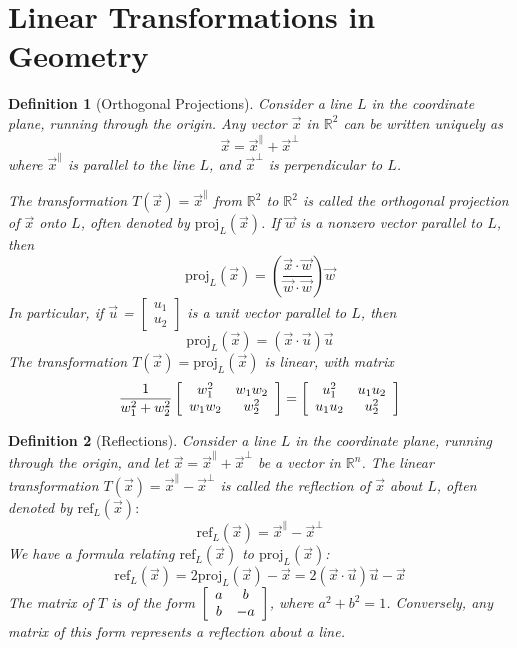 \documentclass[10pt]{report}
\newtheorem{def2}{Definition}[section]
\begin{document}
\section{Linear Transformations in Geometry}
\begin{def2}[Orthogonal Projections]
Consider a line $L$ in the coordinate plane, running through the origin. Any vector $\vec{x}$ in $\mathbb{R}^2$ can be written uniquely as
$$\vec{x} = \vec{x}^{\parallel} + \vec{x}^{\perp}$$
where $\vec{x}^{\parallel}$ is parallel to the line $L$, and $\vec{x}^{\perp}$ is perpendicular to $L$.

The transformation $T(\vec{x})= \vec{x}^{\parallel}$ from $\mathbb{R}^2$ to $\mathbb{R}^2$ is called the orthogonal projection of $\vec{x}$ onto $L$, often denoted by $\text{proj}_L( \vec{x})$. If $\vec{w}$ is a nonzero vector parallel to $L$, then
$$\text{proj}_L( \vec{x}) = \left(\frac{\vec{x} \cdot \vec{w}}{\vec{w} \cdot \vec{w}}\right) \vec{w}$$
In particular, if $\vec{u}$ = $\left[ \begin{array}{c}
u_1\\
u_2
\end{array}\right]$ is a unit vector parallel to $L$, then
$$\text{proj}_L( \vec{x}) = (\vec{x} \cdot \vec{u}) \vec{u}$$
The transformation $T (\vec{x}) = \text{proj}_L (\vec{x})$ is linear, with matrix
$$\frac{1}{w_1^2 + w_2^2}\left[ \begin{array}{c c}
w_1^2 & w_1w_2\\
w_1w_2 & w_2^2
\end{array}\right] = \left[ \begin{array}{c c}
u_1^2 & u_1u_2\\
u_1u_2 & u_2^2
\end{array}\right]$$
\end{def2}
\begin{def2}[Reflections]
Consider a line $L$ in the coordinate plane, running through the origin, and let $\vec{x} = \vec{x}^{\parallel} + \vec{x}^{\perp}$ be a vector in $\mathbb{R}^n$. The linear transformation $T(\vec{x}) = \vec{x}^{\parallel} - \vec{x}^{\perp}$ is called the reflection of $\vec{x}$ about $L$, often denoted by $\text{ref}_L( \vec{x}):$
$$\text{ref}_L(\vec{x}) = \vec{x}^{\parallel} - \vec{x}^{\perp}$$
We have a formula relating $\text{ref}_L(\vec{x})$ to $\text{proj}_L(\vec{x})$:
$$\text{ref}_L(\vec{x}) = 2\text{proj}_L(\vec{x}) - \vec{x}=2( \vec{x} \cdot \vec{u}) \vec{u} - \vec{x}$$
The matrix of $T$ is of the form $\left[ \begin{array}{c c}
a & b\\
b & -a
\end{array}\right]$, where $a^2 + b^2 = 1$. Conversely, any matrix of this form represents a reflection about a line.
\end{def2}
\end{document}
